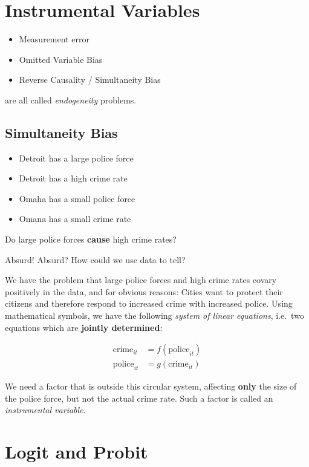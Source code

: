 \documentclass[]{book}
\providecommand{\tightlist}{%
  \setlength{\itemsep}{0pt}\setlength{\parskip}{0pt}}
\theoremstyle{definition}
\theoremstyle{definition}
\theoremstyle{definition}
\theoremstyle{remark}
\begin{document}
\chapter{Instrumental Variables}\label{IV}

\begin{itemize}
\tightlist
\item
  Measurement error
\item
  Omitted Variable Bias
\item
  Reverse Causality / Simultaneity Bias
\end{itemize}

are all called \emph{endogeneity} problems.

\section{Simultaneity Bias}\label{simultaneity-bias}

\begin{itemize}
\tightlist
\item
  Detroit has a large police force
\item
  Detroit has a high crime rate
\item
  Omaha has a small police force
\item
  Omana has a small crime rate
\end{itemize}

Do large police forces \textbf{cause} high crime rates?

Absurd! Absurd? How could we use data to tell?

We have the problem that large police forces and high crime rates covary
positively in the data, and for obvious reasons: Cities want to protect
their citizens and therefore respond to increased crime with increased
police. Using mathematical symbols, we have the following \emph{system
of linear equations}, i.e.~two equations which are \textbf{jointly
determined}:

\begin{align*}
\text{crime}_{it} &= f(\text{police}_{it}) \\
\text{police}_{it}&= g(\text{crime}_{it} )
\end{align*}

We need a factor that is outside this circular system, affecting
\textbf{only} the size of the police force, but not the actual crime
rate. Such a factor is called an \emph{instrumental variable}.

\chapter{Logit and Probit}\label{logit-probit}
\end{document}
